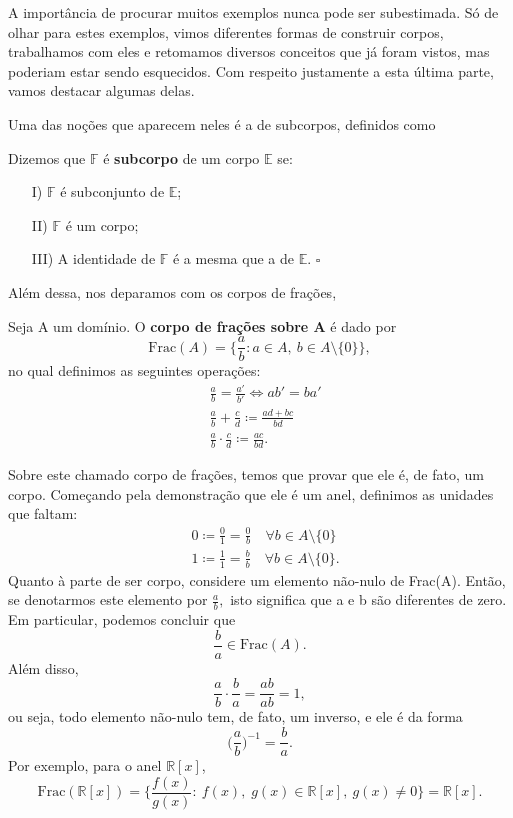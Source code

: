 \documentclass[../algebraIII_notes.tex]{subfiles}
\begin{document}
A importância de procurar muitos exemplos nunca pode ser subestimada. Só de olhar para estes exemplos, vimos diferentes formas de construir corpos, trabalhamos com eles e retomamos diversos conceitos que já foram vistos, mas poderiam estar sendo esquecidos.
Com respeito justamente a esta última parte, vamos destacar algumas delas.

Uma das noções que aparecem neles é a de subcorpos, definidos como
\begin{def*}
	Dizemos que \(\mathbb{F}\) é \textbf{subcorpo} de um corpo \(\mathbb{E}\) se:
	\begin{itemize}
		\item[I)] \(\mathbb{F}\) é subconjunto de \(\mathbb{E}\);
		\item[II)] \(\mathbb{F}\) é um corpo;
		\item[III)] A identidade de \(\mathbb{F}\) é a mesma que a de \(\mathbb{E}\). \(\square\)
	\end{itemize}
\end{def*}
Além dessa, nos deparamos com os corpos de frações,
\begin{def*}
	Seja A um domínio. O \textbf{corpo de frações sobre A} é dado por
	\[
		\mathrm{Frac}(A) = \biggl\{\frac{a}{b}: a\in A,\: b\in A\setminus{\{0\}}\biggr\},
	\]
	no qual definimos as seguintes operações:
	\begin{align*}
		 & \frac{a}{b} = \frac{a'}{b'} \Longleftrightarrow ab' = ba' \\
		 & \frac{a}{b} + \frac{c}{d} \coloneqq \frac{ad + bc}{bd}    \\
		 & \frac{a}{b} \cdot \frac{c}{d} \coloneqq \frac{ac}{bd}.
	\end{align*}
\end{def*}
Sobre este chamado corpo de frações, temos que provar que ele é, de fato, um corpo. Começando pela demonstração que ele é um anel, definimos as unidades que faltam:
\begin{align*}
	 & 0 \coloneqq \frac{0}{1} = \frac{0}{b}\quad \forall b\in A\setminus{\{0\}} \\
	 & 1\coloneqq \frac{1}{1} = \frac{b}{b}\quad \forall b\in A\setminus{\{0\}}.
\end{align*}
Quanto à parte de ser corpo, considere um elemento não-nulo de Frac(A). Então, se denotarmos este elemento por \(\frac{a}{b},\) isto significa que a e b são diferentes de zero. Em particular, podemos concluir que
\[
	\frac{b}{a}\in \mathrm{Frac}(A).
\]
Além disso,
\[
	\frac{a}{b}\cdot \frac{b}{a} = \frac{ab}{ab} = 1,
\]
ou seja, todo elemento não-nulo tem, de fato, um inverso, e ele é da forma
\[
	\biggl(\frac{a}{b}\biggr)^{-1} = \frac{b}{a}.
\]
Por exemplo, para o anel \(\mathbb{R}[x]\),
\[
	\mathrm{Frac}(\mathbb{R}[x]) = \biggl\{\frac{f(x)}{g(x)}:\: f(x),\; g(x)\in \mathbb{R}[x], \: g(x)\neq 0\biggr\} = \mathbb{R}[x].
\]
\end{document}
